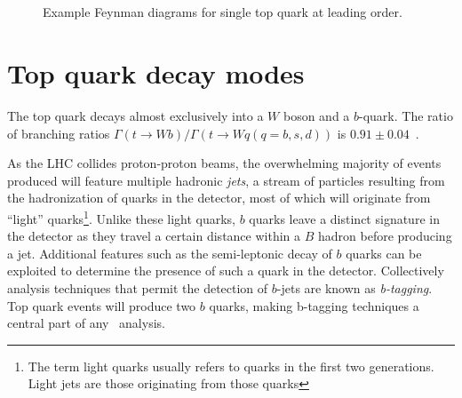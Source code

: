 \begin{figure}[tbph]
  \centering
  \begin{minipage}[][][t]{.47\textwidth}
    \centering
    
     \label{fig:TopSingleSChannel}
  \end{minipage}
  \,
  \begin{minipage}[][][t]{.47\textwidth}
    \centering
    
     \label{fig:TopSingletWChannel}
  \end{minipage}

  \begin{minipage}[][][t]{.47\textwidth}
    \centering
    
     \label{fig:TopSingleqtbChannel}
  \end{minipage}
  \,
  \begin{minipage}[][][t]{.47\textwidth}
    \centering
    
     \label{fig:TopSingleqtChannel}
  \end{minipage}
  \caption{Example Feynman diagrams for single top quark at leading order.}
  \label{fig:TopSingleProduction}
\end{figure}

\section{Top quark decay modes} \label{sec:top_quark_decay_modes}

The top quark decays almost exclusively into a $W$ boson and a $b$-quark. The ratio of branching ratios $\Gamma(t\rightarrow Wb)/\Gamma(t\rightarrow Wq(q=b,s,d))$ is $0.91\pm0.04$~\cite{Theory:PDGBooklet}.

As the LHC collides proton-proton beams, the overwhelming majority of events produced will feature multiple hadronic \textit{jets}, a stream of particles resulting from the hadronization of quarks in the detector, most of which will originate from ``light'' quarks\footnote{The term light quarks usually refers to quarks in the first two generations. Light jets are those originating from those quarks}. Unlike these light quarks, $b$ quarks leave a distinct signature in the detector as they travel a certain distance within a $B$ hadron before producing a jet. Additional features such as the semi-leptonic decay of $b$ quarks can be exploited to determine the presence of such a quark in the detector. Collectively analysis techniques that permit the detection of $b$-jets are known as \textit{b-tagging}. Top quark events will produce two $b$ quarks, making b-tagging techniques a central part of any \ttbar\ analysis.

